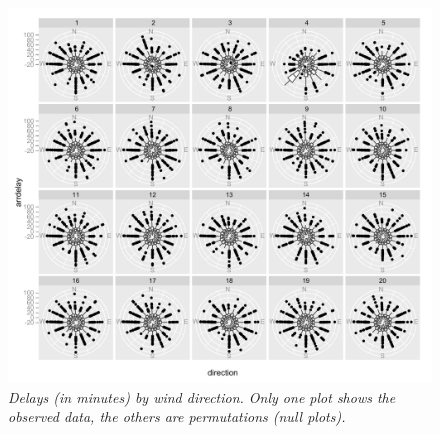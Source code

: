 \documentclass[11pt]{article}
\begin{document}
\begin{figure}[htbp] %
   \centering
   \includegraphics[width=6in]{winds-phoenix} 
\vspace{-10pt}
   \caption{\it Delays (in minutes) by wind direction. Only one plot shows the observed data, the others are permutations (null plots).}
   \label{phx-test}
\end{figure}
\end{document}

